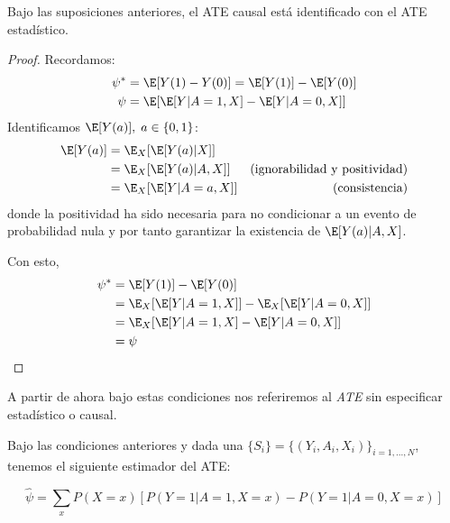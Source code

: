\begin{proposicion}
	Bajo las suposiciones anteriores, el ATE causal está identificado con el ATE estadístico.
\end{proposicion}

\begin{proof}\cite[sección 2.2]{mci}
	Recordamos:
	\begin{align*}
		\psi^* & = \E[Y(1) - Y(0)] = \E[Y(1)] - \E[Y(0)]    \\
		\psi   & = \E[ \E[Y | A = 1, X] - \E[Y | A = 0, X]]
	\end{align*}
	Identificamos $\E[Y(a)], \; a \in \{0, 1\}$:
	\begin{align*}
		\E[Y(a)] & = \E_X[\E[Y(a) | X]]     &                                      \\
		         & = \E_X[\E[Y(a) | A, X]]  & \text{(ignorabilidad y positividad)} \\
		         & = \E_X[\E[Y | A = a, X]] & \text{(consistencia)}                \\
	\end{align*}
	donde la positividad ha sido necesaria para no condicionar a un evento de probabilidad nula
	y por tanto garantizar la existencia de $\E[Y(a) | A, X]$.

	Con esto,
	\begin{align*}
		\psi^* & = \E[Y(1)] - \E[Y(0)]                             \\
		       & = \E_X[\E[Y | A = 1, X]] - \E_X[\E[Y | A = 0, X]] \\
		       & = \E_X[\E[Y | A = 1, X] - \E[Y | A = 0, X]]       \\
		       & = \psi
	\end{align*}
\end{proof}

\begin{nota}
	A partir de ahora bajo estas condiciones nos referiremos al \textit{ATE} sin especificar estadístico o causal.
\end{nota}

\begin{proposicion}
	Bajo las condiciones anteriores y dada una \MAS $\{S_i\} = \{(Y_i, A_i, X_i)\}_{i = 1, ..., N}$, tenemos el siguiente estimador del ATE:

	$$
		\hat\psi = \sum_x P(X = x) \left[P(Y = 1 | A = 1, X = x) - P(Y = 1 | A = 0, X = x) \right]
	$$
\end{proposicion}

